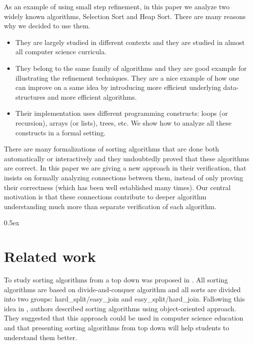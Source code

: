 \documentclass[11pt,a4paper]{article}
\begin{document}
As an example of using small step refinement, in this paper we analyze
two widely known algorithms, Selection Sort and Heap Sort. There are
many reasons why we decided to use them.
\begin{itemize}
\item They are largely studied in different contexts and they are
  studied in almost all computer science curricula.
\item They belong to the same family of algorithms and they are good
  example for illustrating the refinement techniques. They are a nice
  example of how one can improve on a same idea by introducing more
  efficient underlying data-structures and more efficient algorithms.
\item Their implementation uses different programming constructs:
  loops (or recursion), arrays (or lists), trees, etc. We show how to
  analyze all these constructs in a formal setting.
\end{itemize}

There are many formalizations of sorting algorithms that are done both
automatically or interactively and they undoubtedly proved that these
algorithms are correct. In this paper we are giving a new approach in
their verification, that insists on formally analyzing connections
between them, instead of only proving their correctness (which has
been well established many times). Our central motivation is that
these connections contribute to deeper algorithm understanding much
more than separate verification of each algorithm.


\parindent 0pt\parskip 0.5ex




\section{Related work}
\label{sec:related}

To study sorting algorithms from a top down was proposed in
\cite{meritt}. All sorting algorithms are based on divide-and-conquer
algorithm and all sorts are divided into two groups:
hard\_split/easy\_join and easy\_split/hard\_join. Fallowing this idea
in \cite{dps}, authors described sorting algorithms using
object-oriented approach. They suggested that this approach could be
used in computer science education and that presenting sorting
algorithms from top down will help students to understand them better.
\end{document}
